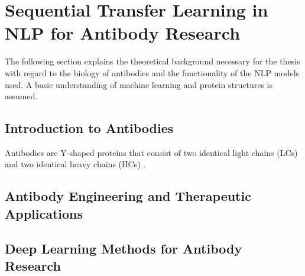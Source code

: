 \chapter{Sequential Transfer Learning in NLP for Antibody Research} \label{theorie}


The following section explains the theoretical background necessary for the thesis with regard to the biology of antibodies and the functionality of the NLP models used. A basic understanding of machine learning and protein structures is assumed.

\section{Introduction to Antibodies}


Antibodies are Y-shaped proteins that consist of two identical light chains (LCs) and two identical heavy chains (HCs) \citep{Chiu2019}.


\section{Antibody Engineering and Therapeutic Applications}


\section{Deep Learning Methods for Antibody Research}

